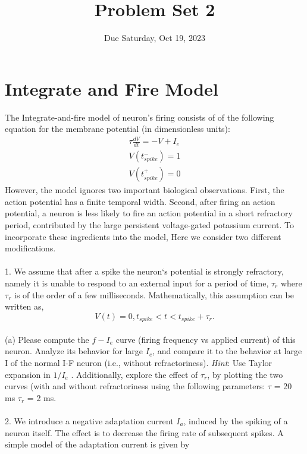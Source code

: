 \documentclass{article}
\title{Problem Set 2}
\date{Due Saturday, Oct 19, 2023}
\begin{document}
\maketitle 

\section*{Integrate and Fire Model}
The Integrate-and-fire model of neuron's firing consists of of the following equation for the membrane potential (in dimensionless units):
\begin{equation}
\label{vanilla current}
\begin{aligned}
\tau\frac{dV}{dt}=-V+I_e  \\
V(t_{spike}^{-})=1 \\
V(t_{spike}^{+})=0
\end{aligned}
\end{equation}   
However, the model ignores two important biological observations. First, the action potential has a finite temporal width. Second, after firing an action potential,  a neuron is less likely to fire an action potential in a short refractory period, contributed by the large persistent voltage-gated potassium current. To incorporate these ingredients into the model, Here we consider two different modifications. 
\\
\\
1. We assume that after a spike the neuron‘s potential is strongly refractory, namely it is unable to respond to an external input for a period of time, $\tau_r$ where $\tau_r$ is of the order of a few milliseconds. Mathematically, this assumption can be written as,
\begin{equation}
V(t)=0, t_{spike}< t < t_{spike}+\tau_r. 
\end{equation}
\\
(a) Please compute the $f-I_e$ curve (firing frequency vs applied current) of this neuron. Analyze its behavior for large $I_e$, and compare it to the behavior at large I of the normal I-F neuron (i.e., without refractoriness). \textit{Hint}: Use Taylor expansion in $1/I_e$ . Additionally, explore the effect of $\tau_r$, by plotting the two curves (with and without refractoriness using the following parameters: $\tau$ = 20 ms $\tau_r$ = 2 ms.
\\
\\
2. We introduce a negative adaptation current $I_a$, induced by the spiking of a neuron itself. The effect is to decrease the firing rate of subsequent spikes. A simple model of the adaptation current is given by
\end{document}
